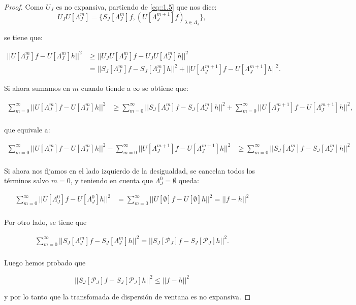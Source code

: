 \begin{proof}
Como $U_J$ es no expansiva, partiendo de \eqref{eq::1.5} que nos dice: 
$$U_J U[\Lambda_J^m]=\lbrace S_J[\Lambda_J^m]f,(U[\Lambda_J^{m+1}]f)_{\lambda\in\Lambda_J}\rbrace,$$

se tiene que:

\begin{align*}
    ||U[\Lambda_J^m]f-U[\Lambda_J^m]h||^2 &\geq ||U_J U[\Lambda_J^m]f-U_J U[\Lambda_J^m]h||^2 \\
    & = ||S_J[\Lambda_J^m]f - S_J[\Lambda_J^m]h||^2 + ||U[\Lambda_J^{m+1}]f-U[\Lambda_J^{m+1}]h||^2.
\end{align*}

\medskip

\noindent Si ahora sumamos en $m$ cuando tiende a $\infty$ se obtiene que: 

\begin{align*}
  \sum_{m=0}^{\infty}||U[\Lambda_J^m]f-U[\Lambda_J^m]h||^2 &\geq \sum_{m=0}^{\infty} ||S_J[\Lambda_J^m]f - S_J[\Lambda_J^m]h||^2 + \sum_{m=0}^{\infty} ||U[\Lambda_J^{m+1}]f-U[\Lambda_J^{m+1}]h||^2,\\
\end{align*}

\noindent que equivale a:

\begin{align*}
  \sum_{m=0}^{\infty}||U[\Lambda_J^m]f-U[\Lambda_J^m]h||^2 - \sum_{m=0}^{\infty} ||U[\Lambda_J^{m+1}]f-U[\Lambda_J^{m+1}]h||^2 &\geq \sum_{m=0}^{\infty} ||S_J[\Lambda_J^m]f - S_J[\Lambda_J^m]h||^2\\
\end{align*}

\noindent Si ahora nos fijamos en el lado izquierdo de la desigualdad, se cancelan todos los términos salvo $m=0$, y teniendo en cuenta que $\Lambda^0_J=\emptyset$ queda: 

\begin{align*}
  \sum_{m=0}^{\infty}||U[\Lambda_J^0]f-U[\Lambda_J^0]h||^2 &= \sum_{m=0}^{\infty}||U[\emptyset]f-U[\emptyset]h||^2 = || f - h ||^2 \\
\end{align*}

\noindent Por otro lado, se tiene que

\begin{align*}
  \sum_{m=0}^{\infty} ||S_J[\Lambda_J^m]f - S_J[\Lambda_J^m]h||^2 = ||S_J[\mathcal{P}_J]f - S_J[\mathcal{P}_J]h||^2. \\
\end{align*}

\noindent Luego hemos probado que 

$$||S_J[\mathcal{P}_J]f - S_J[\mathcal{P}_J]h||^2 \leq || f - h ||^2$$

\noindent y por lo tanto que la transfomada de dispersión de ventana es no expansiva. \qedhere
\end{proof}

